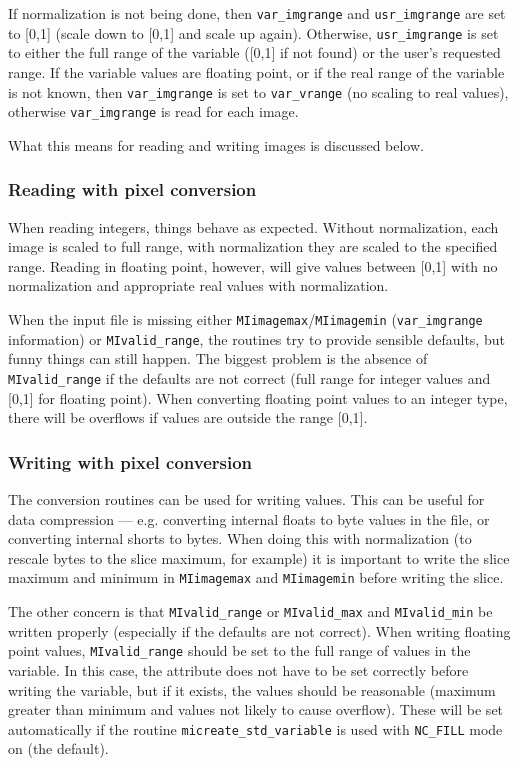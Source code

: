 If normalization is not being done, then \verb+var_imgrange+ and
\verb+usr_imgrange+ are set to [0,1] (scale down to [0,1] and
scale up again).  Otherwise, \verb+usr_imgrange+ is set to either the full
range of the variable ([0,1] if not found) or the user's requested
range. If the variable values are floating point, or if the real range
of the variable is not known, then \verb+var_imgrange+ is set to
\verb+var_vrange+ (no scaling to real values), otherwise
\verb+var_imgrange+ is read for each image.

What this means for reading and writing images is discussed below.

\subsubsection{Reading with pixel conversion}

When reading integers, things behave as expected. Without
normalization, each image is scaled to full range, with normalization
they are scaled to the specified range. Reading in floating point,
however, will give values between [0,1] with no normalization and
appropriate real values with normalization.

When the input file is missing either
\verb+MIimagemax+/\verb+MIimagemin+ (\verb+var_imgrange+ information)
or \verb+MIvalid_range+, the routines try to provide sensible
defaults, but funny things can still happen. The biggest problem is
the absence of \verb+MIvalid_range+ if the defaults are not correct
(full range for integer values and [0,1] for floating point). When
converting floating point values to an integer type, there will be
overflows if values are outside the range [0,1].

\subsubsection{Writing with pixel conversion}

The conversion routines can be used for writing values. This can be
useful for data compression --- e.g. converting internal floats to
byte values in the file, or converting internal shorts to bytes. When
doing this with normalization (to rescale bytes to the slice maximum,
for example) it is important to write the slice maximum and minimum in
\verb+MIimagemax+ and \verb+MIimagemin+ before writing the slice.

The other concern is that \verb+MIvalid_range+ or \verb+MIvalid_max+
and \verb+MIvalid_min+ be written properly (especially if the defaults
are not correct). When writing floating point values,
\verb+MIvalid_range+ should be set to the full range of values in the
variable. In this case, the attribute does not have to be set
correctly before writing the variable, but if it exists, the values
should be reasonable (maximum greater than minimum and values not
likely to cause overflow). These will be set automatically if the
routine \verb+micreate_std_variable+ is used with
\verb+NC_FILL+ mode on (the default).

